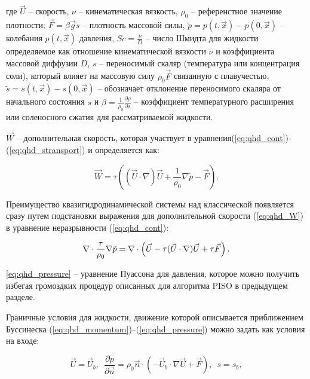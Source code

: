 \noindent где $\vec U$ -- скорость, $\nu$ -- кинематическая вязкость, $\rho_0$ -- референстное значение плотности; $\vec{F} = \beta \vec g \tilde s$ -- плотность массовой силы, $\tilde p=p(t,\vec x)-p(0,\vec x)$ -- колебания $p(t,\vec x)$ давления, $Sc=\frac{\nu}{D}$ -- число Шмидта для жидкости определяемое как отношение кинематической вязкости  $\nu$ и коэффициента массовой диффузии $D$, $s$ -- переносимый скаляр (температура или концентрация соли), который влияет на массовую силу $\rho_0 \vec F$ связанную с плавучестью, $\tilde s = s(t,\vec x) - s(0, \vec x)$ -- обозначает отклонение переносимого скаляра от начального состояния $s$ и $\beta=\frac{1}{\rho_0}\frac{\partial \rho }{\partial s}$ -- коэффициент температурного расширения или соленосного сжатия для рассматриваемой жидкости.

$\vec{W}$ -- дополнительная скорость, которая участвует в уравнения(\ref{eq:qhd_cont})-(\ref{eq:qhd_stransport}) и определяется как:

\begin{equation}\label{eq:qhd_W}
      \vec W = \tau \left ( (\vec U \cdot \nabla) \vec U + \frac{1}{\rho_0} \nabla \tilde p - \vec F  \right ).
\end{equation}

Преимущество квазигидродинамической системы над классической появляется сразу путем подстановки выражения для дополнительной скорости (\ref{eq:qhd_W}) в уравнение неразрывности (\ref{eq:qhd_cont}):

\begin{equation}\label{eq:qhd_pressure}
     \nabla \cdot \frac{\tau}{\rho_0}\nabla \Tilde{p} = 
     \nabla \cdot \left (\vec{U} - \tau (\vec{U} \cdot \nabla) \vec{U} +  
     \tau \vec{F} \right ).
\end{equation}

\ref{eq:qhd_pressure} -- уравнение Пуассона для давления, которое можно получить избегая громоздких процедур описанных для алгоритма PISO в предыдущем разделе. 

Граничные условия для жидкости, движение которой описывается приближением Буссинеска (\ref{eq:qhd_momentum})--(\ref{eq:qhd_pressure}) можно задать как условия на входе:

\begin{equation}\label{eq:qhd_inlet}
    \vec{U} = \vec{U}_b, \,\,\, \frac{\partial \tilde p}{ \partial \vec{n}} = \rho_0 \vec n \cdot \left ( -\vec U_b \cdot \nabla \vec U + \vec F \right), \,\,\, s = s_b,
\end{equation}  

